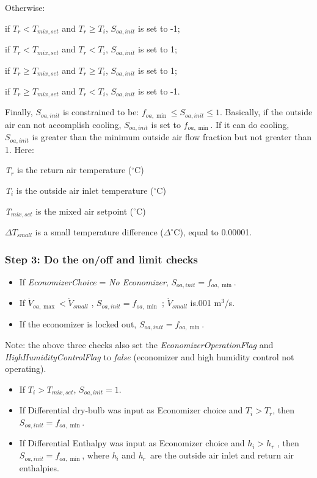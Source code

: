 Otherwise:

if \({T_r} < {T_{mix,set}}\) and \({T_r} \ge {T_i}\), \({S_{oa,init}}\) is set to -1;

if \({T_r} < {T_{mix,set}}\) and \({T_r} < {T_i}\), \({S_{oa,init}}\) is set to 1;

if \({T_r} \ge {T_{mix,set}}\) and \({T_r} \ge {T_i}\), \({S_{oa,init}}\) is set to 1;

if \({T_r} \ge {T_{mix,set}}\) and \({T_r} < {T_i}\), \({S_{oa,init}}\) is set to -1.

Finally, \({S_{oa,init}}\) is constrained to be: \({f_{oa,\min }} \le {S_{oa,init}} \le 1\). Basically, if the outside air can not accomplish cooling, \({S_{oa,init}}\) is set to \({f_{oa,\min }}\). If it can do cooling, \({S_{oa,init}}\) is greater than the minimum outside air flow fraction but not greater than 1. Here:

\emph{T\(_{r}\)} is the return air temperature (\(^{\circ}\)C)

\emph{T\(_{i}\)} is the outside air inlet temperature (\(^{\circ}\)C)

\emph{T\(_{mix,set}\)} is the mixed air setpoint (\(^{\circ}\)C)

\emph{\(\Delta {T_{small}}\)} is a small temperature difference (\(\Delta^{\circ}\)C), equal to 0.00001.

\subsubsection{Step 3: Do the on/off and limit checks}\label{step-3-Do-the-onoff-and-limit-checks}

\begin{itemize}
\item
If \emph{EconomizerChoice} = \emph{No Economizer}, \({S_{oa,init}} = {f_{oa,\min }}\).
\item
If \({\dot V_{oa,\max }} < {\dot V_{small}}\) , \({S_{oa,init}} = {f_{oa,\min }}\) ; \({\dot V_{small}}\) is.001 m\(^{3}\)/s.
\item
If the economizer is locked out, \({S_{oa,init}} = {f_{oa,\min }}\).
\end{itemize}

Note: the above three checks also set the \emph{EconomizerOperationFlag} and \emph{HighHumidityControlFlag} to \emph{false} (economizer and high humidity control not operating).

\begin{itemize}
\item If \({T_i} > {T_{mix,set}}\), \({S_{oa,init}} = 1\).
\item If Differential dry-bulb was input as Economizer choice and \({T_i} > {T_r}\), then \({S_{oa,init}} = {f_{oa,\min }}\).
\item If Differential Enthalpy was input as Economizer choice and \({h_i} > {h_r}\) , then \({S_{oa,init}} = {f_{oa,\min }}\), where \emph{h\(_{i}\)} and \emph{h\(_{r}\)}~are the outside air inlet and return air enthalpies.
\end{itemize}

